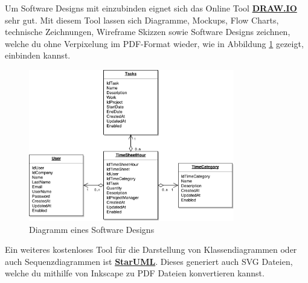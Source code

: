 Um Software Designs mit einzubinden eignet sich das Online Tool \textbf{\href{https://www.draw.io/}{DRAW.IO}} sehr gut. Mit diesem Tool lassen sich Diagramme, Mockups, Flow Charts, technische Zeichnungen, Wireframe Skizzen sowie Software Designs zeichnen, welche du ohne Verpixelung im PDF-Format wieder, wie in Abbildung \ref{fig:Diagramm-DrawIo} gezeigt, einbinden kannst.

\begin{figure}[ht]
	\centering
	\includegraphics[width=0.8\textwidth]{Bilder/Diagramm.pdf} 
	\caption{Diagramm eines Software Designs}
	\label{fig:Diagramm-DrawIo}
\end{figure}

Ein weiteres kostenloses Tool für die Darstellung von Klassendiagrammen oder auch Sequenzdiagrammen ist \textbf{\href{http://staruml.io/}{StarUML}}. Dieses generiert auch SVG Dateien, welche du mithilfe von Inkscape zu PDF Dateien konvertieren kannst.
